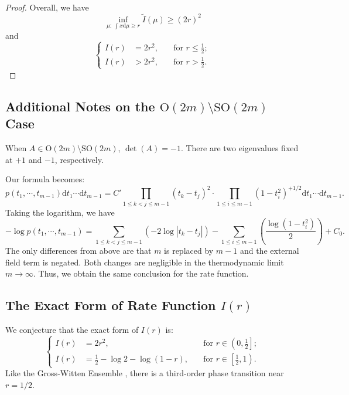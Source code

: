\documentclass{article} %
\begin{document}
\begin{proof}
    Overall, we have
    \[ \inf _{\mu:\ \int x\mathrm{d} \mu \ge r} \tilde{I} (\mu) \ge (2r)^2\]
    and
    \[ 
    \left\{ \begin{aligned}
    I(r) &= 2r^2, \quad &\text{for } r \le \frac12; \\
    I(r) &> 2r^2, \quad &\text{for } r > \frac12. 
    \end{aligned} \right.\]

\end{proof}

\subsection{Additional Notes on the $\mathrm{O}(2m) \setminus \mathrm{SO}(2m)$ Case}
When $A \in \mathrm{O}(2m) \setminus \mathrm{SO}(2m)$, $\det(A) = -1$. There are two eigenvalues fixed at
$+1$ and $-1$, respectively.

Our formula becomes:
\[p(t_1, \cdots, t_{m-1})\mathrm{d}t_1 \cdots\mathrm{d}t_{m-1}  = C' \prod_{1\leq k<j\leq m-1}(t_k - t_j)^2 \cdot \prod_{1\leq i \leq m-1} (1-t_i^2)^{+1/2} \mathrm{d}t_1 \cdots\mathrm{d}t_{m-1}.\]
Taking the logarithm, we have
\[-\log p(t_1, \cdots, t_{m-1}) = \sum_{1\leq k<j\leq m-1} \left(-2 \log|t_k - t_j| \right) - \sum_{1\leq i \leq m-1} \left(\frac{\log (1-t_i^2)}{2}\right) + C_0.\]
The only differences from above are that $m$ is replaced by $m-1$ and the external field term is negated. 
Both changes are negligible in the thermodynamic limit $m \to \infty$. Thus, we obtain the same conclusion for the rate function.

\subsection{The Exact Form of Rate Function $I(r)$}
We conjecture that the exact form of $I(r)$ is:
\[ 
    \left\{ \begin{aligned}
    I(r) &= 2r^2, \quad &\text{for } r \in \left(0, \frac{1}{2}\right]; \\
    I(r) &= \frac{1}{2} - \log 2 - \log(1-r), \quad &\text{for } r \in \left[\frac{1}{2}, 1\right). 
    \end{aligned} \right.
\]
Like the Gross-Witten Ensemble \citep{GrossWitten1980}, there is a third-order phase transition near $r= 1/2$. 
\end{document}
